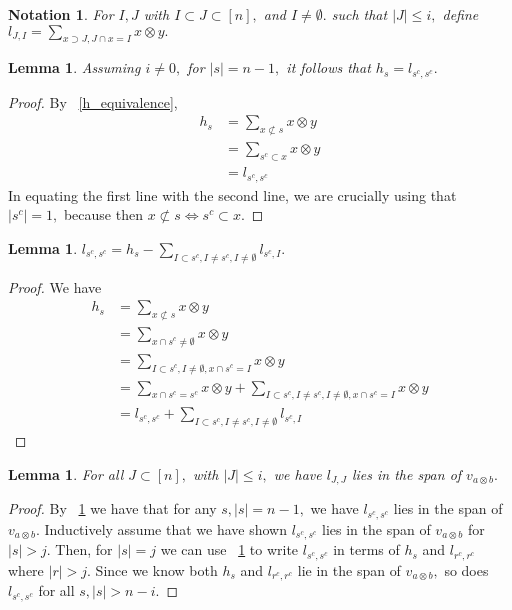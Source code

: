 \documentclass{amsart}
\newtheorem{lem}[subsubsection]{Lemma}
\newtheorem{note}[subsubsection]{Notation}
\begin{document}
\begin{note}
For $I,J$ with $I\subset J \subset [n],$ and $I \neq \emptyset.$ such that $|J| \leq i,$ define $l_{J,I}= \sum_{x \supset J, J \cap x = I}^{}x\otimes y.$
\end{note}

\begin{lem}
\label{l_base_case}
Assuming $i \neq 0,$ for $|s| = n-1,$ it follows that $h_s = l_{s^c,s^c}.$
\end{lem}
\begin{proof}
By ~\ref{h_equivalence},
\begin{align*}
	h_s &=\sum_{x\not\subset s}^{}x\otimes y\\
  	&=\sum_{s^c \subset x}^{} x\otimes y\\
  	&=l_{s^c,s^c}
\end{align*}
In equating the first line with the second line, we are crucially using that $|s^c| = 1,$ because then $x \not \subset s \Leftrightarrow s^c \subset x.$ 
\end{proof}

\begin{lem}
\label{l_induction_step}
$l_{s^c,s^c} = h_s - \sum_{I \subset s^c, I \neq s^c,I \neq\emptyset}^{}l_{s^c,I}.$
\end{lem}
\begin{proof}
We have
\begin{align*}
	h_s & = \sum_{x\not\subset s}^{}x\otimes y\\
	&= \sum_{x\cap s^c \neq \emptyset}^{}x\otimes y\\
	&= \sum_{I \subset s^c,I \neq \emptyset,x\cap s^c = I}^{}x\otimes y\\
	&= \sum_{x\cap s^c = s^c}^{}x\otimes y+\sum_{I \subset s^c,I \neq s^c,I \neq \emptyset,x\cap s^c = I}^{}x\otimes y\\
	&= l_{s^c,s^c} + \sum_{I \subset s^c, I \neq s^c,I \neq \emptyset}^{}l_{s^c,I}
\end{align*}
\end{proof}

\begin{lem}
For all $J \subset [n],$ with $|J| \leq i,$ we have $l_{J,J}$ lies in the span of $v_{a \otimes b}.$ 
\end{lem}
\begin{proof}
By ~\ref{l_base_case} we have that for any $s,|s| = n-1,$ we have $l_{s^c,s^c}$ lies in the span of $v_{a\otimes b}.$ Inductively assume that we have shown $l_{s^c,s^c}$ lies in the span of $v_{a\otimes b}$ for $|s| > j.$ Then, for $|s| = j$ we can use ~\ref{l_induction_step} to write $l_{s^c,s^c}$ in terms of $h_s$ and $l_{r^c,r^c}$ where $|r|>j.$ Since we know both  $h_s$ and $l_{r^c,r^c}$ lie in the span of $v_{a\otimes b},$ so does $l_{s^c,s^c}$ for all $s,|s| > n-i.$
\end{proof}
\end{document}
